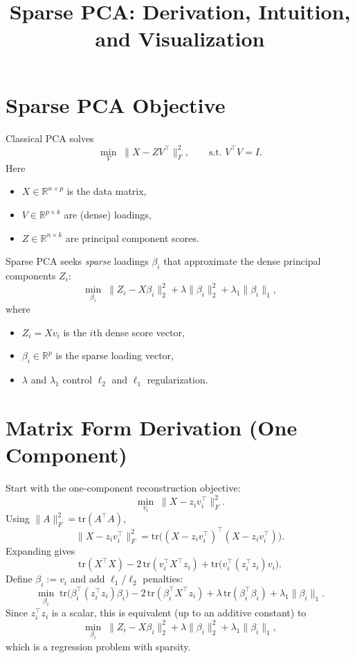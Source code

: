 \documentclass[12pt]{article}
\title{Sparse PCA: Derivation, Intuition, and Visualization}
\author{}
\date{}
\begin{document}
\maketitle

\section{Sparse PCA Objective}

Classical PCA solves
\[
\min_{V} \; \|X - ZV^\top\|_F^2, \qquad \text{s.t. } V^\top V = I.
\]
Here
\begin{itemize}
    \item $X \in \mathbb{R}^{n \times p}$ is the data matrix,
    \item $V \in \mathbb{R}^{p \times k}$ are (dense) loadings,
    \item $Z \in \mathbb{R}^{n \times k}$ are principal component scores.
\end{itemize}

Sparse PCA seeks \emph{sparse} loadings $\beta_i$ that approximate the dense principal components $Z_i$:
\[
\min_{\beta_i} \; \|Z_i - X\beta_i\|_2^2 + \lambda \|\beta_i\|_2^2 + \lambda_1 \|\beta_i\|_1,
\]
where
\begin{itemize}
    \item $Z_i = Xv_i$ is the $i$th dense score vector,
    \item $\beta_i \in \mathbb{R}^p$ is the sparse loading vector,
    \item $\lambda$ and $\lambda_1$ control $\ell_2$ and $\ell_1$ regularization.
\end{itemize}

\section{Matrix Form Derivation (One Component)}

Start with the one-component reconstruction objective:
\[
\min_{v_i} \; \|X - z_i v_i^\top\|_F^2.
\]
Using $\|A\|_F^2 = \mathrm{tr}(A^\top A)$,
\[
\|X - z_i v_i^\top\|_F^2 = \mathrm{tr}\big((X - z_i v_i^\top)^\top (X - z_i v_i^\top)\big).
\]
Expanding gives
\[
\mathrm{tr}(X^\top X)
- 2\,\mathrm{tr}(v_i^\top X^\top z_i)
+ \mathrm{tr}\big(v_i^\top (z_i^\top z_i) v_i\big).
\]
Define $\beta_i := v_i$ and add $\ell_1$/$\ell_2$ penalties:
\[
\min_{\beta_i}
\; \mathrm{tr}\big(\beta_i^\top (z_i^\top z_i) \beta_i\big)
- 2\,\mathrm{tr}(\beta_i^\top X^\top z_i)
+ \lambda\,\mathrm{tr}(\beta_i^\top \beta_i)
+ \lambda_1\|\beta_i\|_1.
\]
Since $z_i^\top z_i$ is a scalar, this is equivalent (up to an additive constant) to
\[
\min_{\beta_i} \; \|Z_i - X\beta_i\|_2^2 + \lambda \|\beta_i\|_2^2 + \lambda_1 \|\beta_i\|_1,
\]
which is a regression problem with sparsity.
\end{document}
